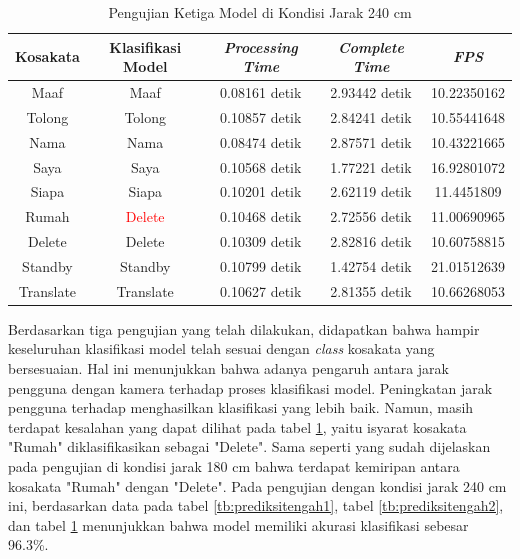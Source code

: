 \begin{longtable}{|c|c|c|c|c|}
  \caption{Pengujian Ketiga Model di Kondisi Jarak 240 cm}
  \label{tb:prediksitengah3}                                   \\
  \hline
  \rowcolor[HTML]{C0C0C0}
  \textbf{Kosakata} & \textbf{Klasifikasi Model} & \textbf{\emph{Processing Time}} & \textbf{\emph{Complete Time}} & \textbf{\emph{FPS}}\\
  \hline
  Maaf              & Maaf                          & 0.08161 detik                           & 2.93442 detik                                  & 10.22350162\\
  Tolong            & Tolong                        & 0.10857 detik                           & 2.84241 detik                                  & 10.55441648\\
  Nama              & Nama                          & 0.08474 detik                           & 2.87571 detik                                  & 10.43221665\\
  Saya              & Saya                          & 0.10568 detik                           & 1.77221 detik                                  & 16.92801072\\
  Siapa             & Siapa                         & 0.10201 detik                           & 2.62119 detik                                  & 11.4451809\\
  Rumah             & \textcolor{red}{Delete}       & 0.10468 detik                           & 2.72556 detik                                  & 11.00690965\\
  Delete            & Delete                        & 0.10309 detik                           & 2.82816 detik                                  & 10.60758815\\
  Standby           & Standby                       & 0.10799 detik                           & 1.42754 detik                                  & 21.01512639\\
  Translate         & Translate                     & 0.10627 detik                           & 2.81355 detik                                  & 10.66268053\\
  \hline
\end{longtable}




Berdasarkan tiga pengujian yang telah dilakukan, didapatkan bahwa hampir keseluruhan klasifikasi model telah sesuai dengan \emph{class} kosakata yang bersesuaian. Hal ini menunjukkan bahwa adanya pengaruh antara jarak pengguna dengan kamera terhadap proses klasifikasi model. Peningkatan jarak pengguna terhadap menghasilkan klasifikasi yang lebih baik. Namun, masih terdapat kesalahan yang dapat dilihat pada tabel \ref{tb:prediksitengah3}, yaitu isyarat kosakata "Rumah" diklasifikasikan sebagai "Delete". Sama seperti yang sudah dijelaskan pada pengujian di kondisi jarak 180 cm bahwa terdapat kemiripan antara kosakata "Rumah" dengan "Delete". Pada pengujian dengan kondisi jarak 240 cm ini, berdasarkan data pada tabel \ref{tb:prediksitengah1}, tabel \ref{tb:prediksitengah2}, dan tabel \ref{tb:prediksitengah3} menunjukkan bahwa model memiliki akurasi klasifikasi sebesar 96.3\%.

